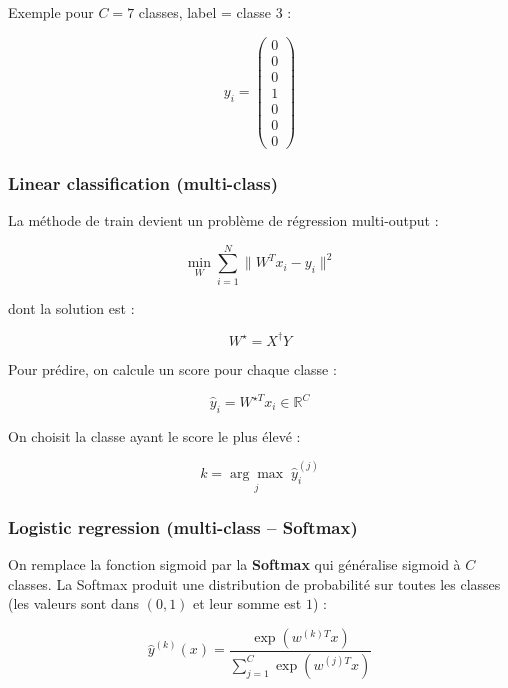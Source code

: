 \documentclass[11pt,a4paper,openany]{book}
\begin{document}
Exemple pour $C = 7$ classes, label = classe 3 :

\[
y_i =
\begin{pmatrix}
0 \\ 0 \\ 0 \\ 1 \\ 0 \\ 0 \\ 0
\end{pmatrix}
\]

\vspace{0.8cm}

\subsubsection{Linear classification (multi-class)}

La méthode de train devient un problème de régression multi-output :

\[
\min_W \sum_{i=1}^{N} \|W^T x_i - y_i\|^2
\]

\vspace{0.4cm}

dont la solution est :

\[
W^\star = X^\dagger Y
\]

\vspace{0.4cm}

Pour prédire, on calcule un score pour chaque classe :

\[
\hat{y}_i = W^{\star T} x_i \in \mathbb{R}^C
\]

\vspace{0.5cm}

On choisit la classe ayant le score le plus élevé :

\[
k =
\underset{j}{\arg\max}
\;
\hat{y}_i^{(j)}
\]

\vspace{0.8cm}

\subsubsection{Logistic regression (multi-class -- Softmax)}

On remplace la fonction sigmoid par la \textbf{Softmax} qui généralise sigmoid à $C$ classes.
La Softmax produit une distribution de probabilité sur toutes les classes (les valeurs sont dans $(0,1)$ et leur somme est $1$) :

\[
\hat{y}^{(k)}(x)
=
\frac{
\exp\left(w^{(k)T}x\right)
}{
\sum_{j=1}^{C}
\exp\left(w^{(j)T}x\right)
}
\]
\end{document}

